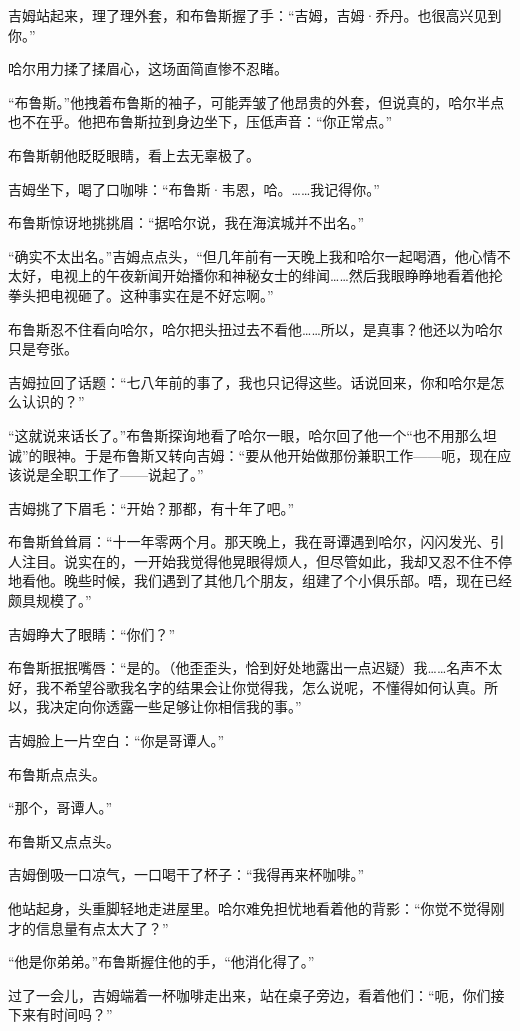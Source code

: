 \documentclass[../main]{subfiles}
\begin{document}
吉姆站起来，理了理外套，和布鲁斯握了手：“吉姆，吉姆·乔丹。也很高兴见到你。”

哈尔用力揉了揉眉心，这场面简直惨不忍睹。

“布鲁斯。”他拽着布鲁斯的袖子，可能弄皱了他昂贵的外套，但说真的，哈尔半点也不在乎。他把布鲁斯拉到身边坐下，压低声音：“你正常点。”

布鲁斯朝他眨眨眼睛，看上去无辜极了。

吉姆坐下，喝了口咖啡：“布鲁斯·韦恩，哈。……我记得你。”

布鲁斯惊讶地挑挑眉：“据哈尔说，我在海滨城并不出名。”

“确实不太出名。”吉姆点点头，“但几年前有一天晚上我和哈尔一起喝酒，他心情不太好，电视上的午夜新闻开始播你和神秘女士的绯闻……然后我眼睁睁地看着他抡拳头把电视砸了。这种事实在是不好忘啊。”

布鲁斯忍不住看向哈尔，哈尔把头扭过去不看他……所以，是真事？他还以为哈尔只是夸张。

吉姆拉回了话题：“七八年前的事了，我也只记得这些。话说回来，你和哈尔是怎么认识的？”

“这就说来话长了。”布鲁斯探询地看了哈尔一眼，哈尔回了他一个“也不用那么坦诚”的眼神。于是布鲁斯又转向吉姆：“要从他开始做那份兼职工作——呃，现在应该说是全职工作了——说起了。”

吉姆挑了下眉毛：“开始？那都，有十年了吧。”

布鲁斯耸耸肩：“十一年零两个月。那天晚上，我在哥谭遇到哈尔，闪闪发光、引人注目。说实在的，一开始我觉得他晃眼得烦人，但尽管如此，我却又忍不住不停地看他。晚些时候，我们遇到了其他几个朋友，组建了个小俱乐部。唔，现在已经颇具规模了。”

吉姆睁大了眼睛：“你们？”

布鲁斯抿抿嘴唇：“是的。（他歪歪头，恰到好处地露出一点迟疑）我……名声不太好，我不希望谷歌我名字的结果会让你觉得我，怎么说呢，不懂得如何认真。所以，我决定向你透露一些足够让你相信我的事。”

吉姆脸上一片空白：“你是哥谭人。”

布鲁斯点点头。

“那个，哥谭人。”

布鲁斯又点点头。

吉姆倒吸一口凉气，一口喝干了杯子：“我得再来杯咖啡。”

他站起身，头重脚轻地走进屋里。哈尔难免担忧地看着他的背影：“你觉不觉得刚才的信息量有点太大了？”

“他是你弟弟。”布鲁斯握住他的手，“他消化得了。”

过了一会儿，吉姆端着一杯咖啡走出来，站在桌子旁边，看着他们：“呃，你们接下来有时间吗？”
\end{document}
